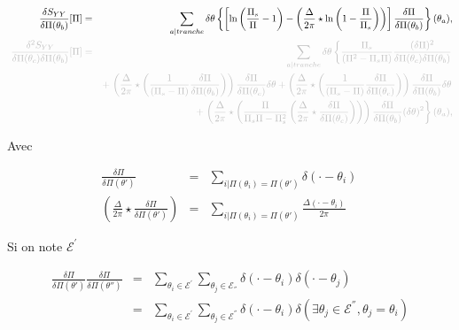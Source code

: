 	\begin{eqnarray}
			\frac{ \delta S_{YY} }{ \delta \Pi(\theta_b)} [\Pi ]  & = & \sum_{a\vert tranche}   \delta \theta \left \{ \left [ \ln \left ( \frac{ \Pi_s }{ \Pi} - 1 \right ) -  \left ( \frac{ \Delta}{2 \pi} \star \ln \left ( 1 - \frac{ \Pi}{ \Pi_s}\right )  \right)\right ]\frac{\delta \Pi }{ \delta \Pi (\theta_b) } \right \} ( \theta_	a ),\\
			{\color{lightgray} \frac{ \delta^2 S_{YY} }{ \delta \Pi(\theta_c) \delta \Pi(\theta_b)  } [\Pi ]}  &  \color{lightgray} = & {\color{lightgray} \sum_{a \vert tranche}   \delta \theta \left \{  \frac{\Pi_s}{(\Pi^2  - \Pi_s\Pi)} \frac{(\delta \Pi)^2}{ \delta \Pi(\theta_c) \delta \Pi(\theta_b)  } \right .} \\
		&  & \color{lightgray}  +  \left . \left (  \frac{\Delta}{2\pi} \star \left ( \frac{1 }{(\Pi_s -\Pi) }  \frac{\delta \Pi}{\delta \Pi(\theta_b)}  \right )   \right ) \frac{\delta \Pi}{\delta \Pi(\theta_c)} \delta \theta+  \left (  \frac{\Delta}{2\pi} \star \left ( \frac{1}{( \Pi_s -  \Pi) } \frac{\delta \Pi}{\delta \Pi(\theta_c)} \right) \right )\frac{\delta \Pi}{\delta \Pi(\theta_b)} \delta \theta  \right . \\
		& & \color{lightgray} + \left .  \left (  \frac{\Delta}{2\pi} \star \left ( \frac{\Pi }{\Pi_s\Pi - \Pi_s^2 }\left (  \frac{\Delta}{2\pi} \star\frac{\delta \Pi}{\delta \Pi(\theta_c)} \right )\right ) \right ) \frac{\delta \Pi}{\delta \Pi(\theta_b)} (\delta \theta)^2  \right \}(\theta_a),	
	\end{eqnarray}
	
	Avec 
	
	\begin{eqnarray}
			\frac{\delta \Pi }{\delta \Pi(\theta') } & = & \sum_{i\vert \Pi(\theta_i) = \Pi(\theta')}  \delta ( \cdot  - \theta_i ) \,  \\
			\left  ( \frac{\Delta}{2\pi} \star \frac{\delta \Pi}{\delta \Pi(\theta') }  \right ) & = & 	\sum_{i \vert \Pi(\theta_i) = \Pi(\theta')}\frac{\Delta ( \cdot - \theta_i )}{2\pi}
	\end{eqnarray}
	
	Si on note $\mathscr{E}^{'}$
	
	\begin{eqnarray}
		\frac{\delta \Pi }{\delta \Pi(\theta') } \frac{\delta \Pi }{\delta \Pi(\theta'') } & = & \sum_{\theta_i \in  \mathscr{E}^{'}} \sum_{\theta_j \in  \mathscr{E}_{''}}   \delta ( \cdot  - \theta_i )	\delta ( \cdot  - \theta_j )	\\
		& = & 	\sum_{\theta_i \in  \mathscr{E}^{'}} \sum_{\theta_j \in  \mathscr{E}^{''}}   \delta ( \cdot  - \theta_i )	\delta ( \exists \theta_j \in \mathscr{E}^{''} , \theta_j = \theta_i )
	\end{eqnarray}
	
